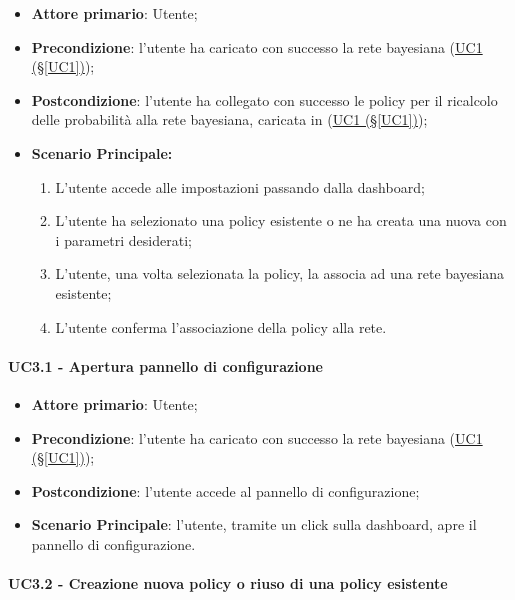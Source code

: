 \begin{itemize}
	\item \textbf{Attore primario}: Utente; 
	\item \textbf{Precondizione}: l'utente ha caricato con successo la rete bayesiana (\hyperref[UC1]{UC1 (§\ref*{UC1})});
	\item \textbf{Postcondizione}: l'utente ha collegato con successo le policy per il ricalcolo delle probabilità alla rete bayesiana, caricata in (\hyperref[UC1]{UC1 (§\ref*{UC1})});	
	\item \textbf{Scenario Principale:}

	\begin{enumerate}
		\item L'utente accede alle impostazioni passando dalla dashboard;
		\item L'utente ha selezionato una policy esistente o ne ha creata una nuova con i parametri desiderati; 
		\item L'utente, una volta selezionata la policy, la associa  ad una rete bayesiana esistente;
		\item L'utente conferma l'associazione della policy alla rete.
	\end{enumerate}
	
\end{itemize}

\paragraph{UC3.1 - Apertura pannello di configurazione}\label{UC3.1}
\begin{itemize}
	\item \textbf{Attore primario}: Utente; 
	\item \textbf{Precondizione}: l'utente ha caricato con successo la rete bayesiana (\hyperref[UC1]{UC1 (§\ref*{UC1})});
	\item \textbf{Postcondizione}: l'utente accede al pannello di configurazione;
	\item \textbf{Scenario Principale}: l'utente, tramite un click sulla dashboard, apre il pannello di configurazione. 
\end{itemize}

\paragraph{UC3.2 - Creazione nuova policy o riuso di una policy esistente}\label{UC3.2}

